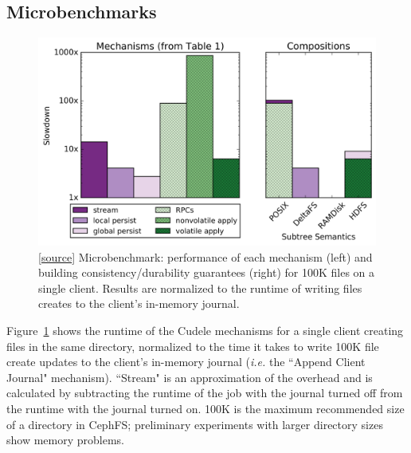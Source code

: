 \subsection{Microbenchmarks}
\label{sec:microbenchmarks}
\begin{figure}[tb]
\centering
\includegraphics[width=1.0\linewidth]{graphs/composable-mechanisms.png}
\caption{[\href{https://www.google.com}{source}] Microbenchmark: performance of each
mechanism (left) and building consistency/durability guarantees (right) for
100K files on a single client. Results are normalized to the runtime of writing
files creates to the client's in-memory journal.
\label{fig:composable-mechanisms}}
\end{figure}


Figure~\ref{fig:composable-mechanisms} shows the runtime of the Cudele
mechanisms for a single client creating files in the same directory, normalized
to the time it takes to write 100K file create updates to the client's
in-memory journal ({\it i.e.} the ``Append Client Journal" mechanism).
``Stream" is an approximation of the overhead and is calculated by subtracting
the runtime of the job with the journal turned off from the runtime with the
journal turned on.  100K is the maximum recommended size of a directory in
CephFS; preliminary experiments with larger directory sizes show memory
problems.

